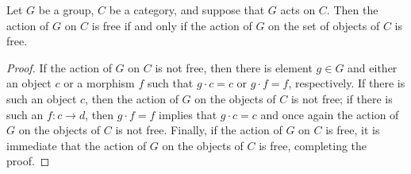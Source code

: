 \begin{lem}\label{lem:free-on-obj}
Let $G$ be a group, $C$ be a category, and suppose that $G$ acts on $C$. Then the action of $G$ on $C$ is free if and only if the action of $G$ on the set of objects of $C$ is free.
\end{lem}
\begin{proof}
If the action of $G$ on $C$ is not free, then there is element $g \in G$ and either an object $c$ or a morphism $f$ such that $g \cdot c = c$ or $g \cdot f = f$, respectively. If there is such an object $c$, then the action of $G$ on the objects of $C$ is not free; if there is such an $f \colon c \to d$, then $g \cdot f = f$ implies that $g \cdot c = c$ and once again the action of $G$ on the objects of $C$ is not free. Finally, if the action of $G$ on $C$ is free, it is immediate that the action of $G$ on the objects of $C$ is free, completing the proof.
\end{proof}

